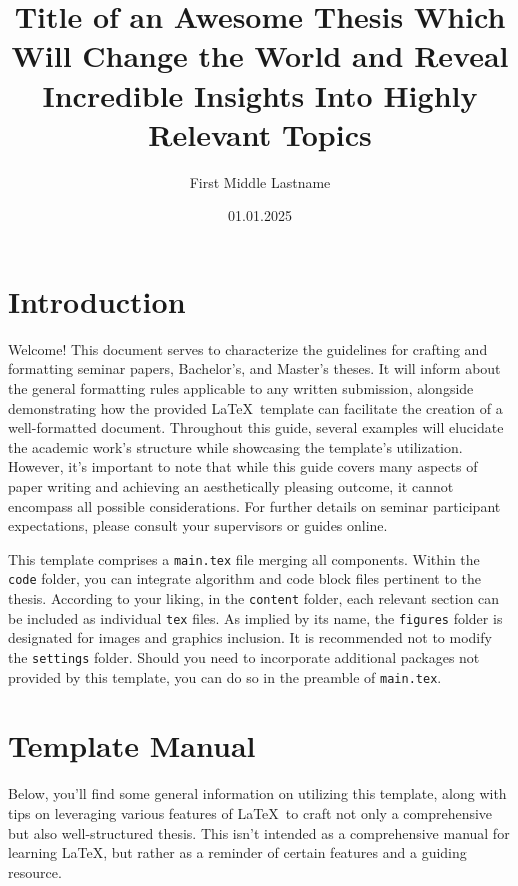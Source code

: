\documentclass[
    language=english, %
    thesis=bachelor, %
    supervisor=postdoc, %
    multiauthor=false, %
    ]{settings/csssa-thesis}
\title{Title of an Awesome Thesis Which Will Change the World and Reveal Incredible Insights Into Highly Relevant Topics}
\author{First Middle Lastname}
\date{01.01.2025}
\begin{document}
\maketitlepage
\maketitle


\begin{abstract}
    \lipsum[1]
\end{abstract}

\section{Introduction}

Welcome! This document serves to characterize the guidelines for crafting and formatting seminar papers, Bachelor's, and Master's theses. It will inform about the general formatting rules applicable to any written submission, alongside demonstrating how the provided \LaTeX\ template can facilitate the creation of a well-formatted document. Throughout this guide, several examples will elucidate the academic work's structure while showcasing the template's utilization. However, it's important to note that while this guide covers many aspects of paper writing and achieving an aesthetically pleasing outcome, it cannot encompass all possible considerations. For further details on seminar participant expectations, please consult your supervisors or guides online.

This template comprises a \texttt{main.tex} file merging all components. Within the \texttt{code} folder, you can integrate algorithm and code block files pertinent to the thesis. According to your liking, in the \texttt{content} folder, each relevant section can be included as individual \texttt{tex} files. As implied by its name, the \texttt{figures} folder is designated for images and graphics inclusion. It is recommended not to modify the \texttt{settings} folder. Should you need to incorporate additional packages not provided by this template, you can do so in the preamble of \texttt{main.tex}.

\section{Template Manual}\label{ch02:manual}

Below, you'll find some general information on utilizing this template, along with tips on leveraging various features of \LaTeX\ to craft not only a comprehensive but also well-structured thesis. This isn't intended as a comprehensive manual for learning \LaTeX, but rather as a reminder of certain features and a guiding resource.
\end{document}
